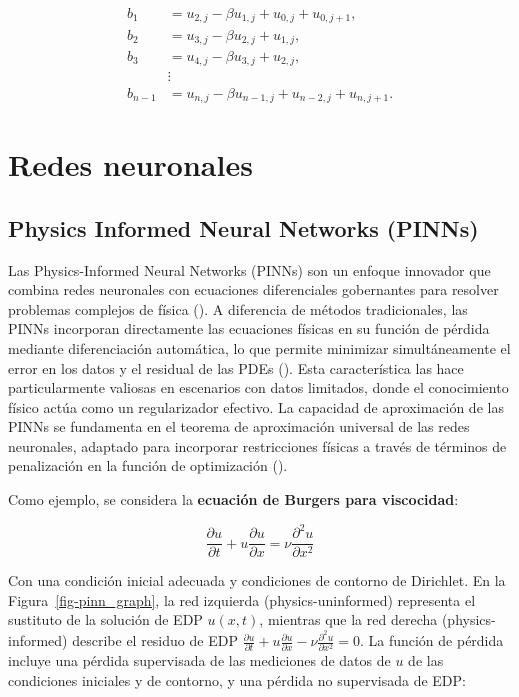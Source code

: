 \documentclass[
  spanish,
  us-letterpaper,
]{scrreprt}
\theoremstyle{plain}
\theoremstyle{definition}
\theoremstyle{remark}
\begin{document}
\begin{align*}
b_1 &= u_{2,j} - \beta u_{1,j} + u_{0,j} + u_{0,j+1}, \\
b_2 &= u_{3,j} - \beta u_{2,j} + u_{1,j}, \\
b_3 &= u_{4,j} - \beta u_{3,j} + u_{2,j}, \\
    &\vdots \\
b_{n-1} &= u_{n,j} - \beta u_{n-1,j} + u_{n-2,j} + u_{n,j+1}.
\end{align*}

\part{Redes neuronales}

\chapter{Physics Informed Neural Networks (PINNs)}\label{sec-pinns}

Las Physics-Informed Neural Networks (PINNs) son un enfoque innovador
que combina redes neuronales con ecuaciones diferenciales gobernantes
para resolver problemas complejos de física
(). A diferencia de
métodos tradicionales, las PINNs incorporan directamente las ecuaciones
físicas en su función de pérdida mediante diferenciación automática, lo
que permite minimizar simultáneamente el error en los datos y el
residual de las PDEs (). Esta característica las hace particularmente
valiosas en escenarios con datos limitados, donde el conocimiento físico
actúa como un regularizador efectivo. La capacidad de aproximación de
las PINNs se fundamenta en el teorema de aproximación universal de las
redes neuronales, adaptado para incorporar restricciones físicas a
través de términos de penalización en la función de optimización
().

Como ejemplo, se considera la \textbf{ecuación de Burgers para
viscocidad}:

\[
\frac{\partial u}{\partial t} + u \frac{\partial u}{\partial x} = \nu \frac{\partial^2 u}{\partial x^2}
\]

Con una condición inicial adecuada y condiciones de contorno de
Dirichlet. En la Figura~\ref{fig-pinn_graph}, la red izquierda
(physics-\hspace{0pt}uninformed) representa el sustituto de la solución
de EDP \(u(x, t)\), mientras que la red derecha
(physics-\hspace{0pt}informed) describe el residuo de EDP
\(\frac{\partial u}{\partial t} + u \frac{\partial u}{\partial x} - \nu \frac{\partial^2 u}{\partial x^2} = 0\).
La función de pérdida incluye una pérdida supervisada de las mediciones
de datos de \(u\) de las condiciones iniciales y de contorno, y una
pérdida no supervisada de EDP:
\end{document}

